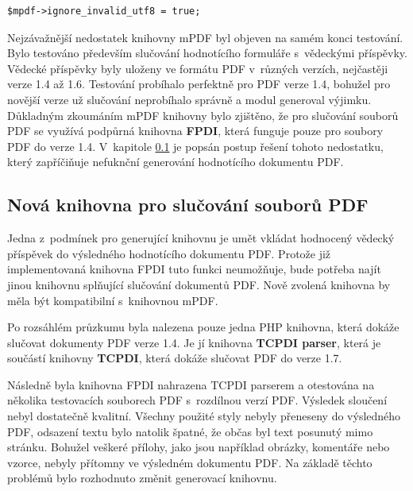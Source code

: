 \begin{lstlisting}[caption = {Nastavení atributu ignore\_invalid\_utf8 (orlib.php)}, label = {lst:ignore_invalid_utf8}, captionpos=b]
$mpdf->ignore_invalid_utf8 = true;
\end{lstlisting}
\par
Nejzávažnější nedostatek knihovny mPDF byl objeven na samém konci testování. Bylo testováno především slučování hodnotícího formuláře s~vědeckými příspěvky. Vědecké příspěvky byly uloženy ve formátu PDF v~různých verzích, nejčastěji verze 1.4 až 1.6. Testování probíhalo perfektně pro PDF verze 1.4, bohužel pro novější verze už slučování neprobíhalo správně a modul generoval výjimku. Důkladným zkoumáním mPDF knihovny bylo zjištěno, že pro slučování souborů PDF se využívá podpůrná knihovna \textbf{FPDI}, která funguje pouze pro soubory PDF do verze 1.4. V~kapitole \ref{subsec:nova_PDF_merge_knihovna} je popsán postup řešení tohoto nedostatku, který zapříčiňuje nefuknční generování hodnotícího dokumentu PDF.

\subsection{Nová knihovna pro slučování souborů PDF}
\label{subsec:nova_PDF_merge_knihovna}
Jedna z~podmínek pro generující knihovnu je umět vkládat hodnocený vědecký příspěvek do výsledného hodnotícího dokumentu PDF. Protože již implementovaná knihovna FPDI tuto funkci neumožňuje, bude potřeba najít jinou knihovnu splňující slučování dokumentů PDF. Nově zvolená knihovna by měla být kompatibilní s~knihovnou mPDF.
\par
Po rozsáhlém průzkumu byla nalezena pouze jedna PHP knihovna, která dokáže slučovat dokumenty PDF verze 1.4. Je jí knihovna \textbf{TCPDI parser}, která je součástí knihovny \textbf{TCPDI}, která dokáže slučovat PDF do verze 1.7.
\par
Následně byla knihovna FPDI nahrazena TCPDI parserem a otestována na několika testovacích souborech PDF s~rozdílnou verzí PDF. Výsledek sloučení nebyl dostatečně kvalitní. Všechny použité styly nebyly přeneseny do výsledného PDF, odsazení textu bylo natolik špatné, že občas byl text posunutý mimo stránku.  Bohužel veškeré přílohy, jako jsou například obrázky, komentáře nebo vzorce, nebyly přítomny ve výsledném dokumentu PDF. Na základě těchto problémů bylo rozhodnuto změnit generovací knihovnu. 

